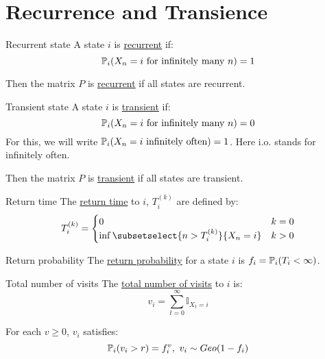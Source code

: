 \documentclass[../Main.tex]{subfiles}
\begin{document}
\section{Recurrence and Transience}
\begin{definition}{Recurrent state}
    A state $i$ is \underline{recurrent} if:
    \begin{equation*}
        \P_i(X_n = i \text{ for infinitely many }n) = 1
    \end{equation*}
\end{definition}
Then the matrix $P$ is \underline{recurrent} if all states are recurrent.
\begin{definition}{Transient state}
    A state $i$ is \underline{transient} if:
    \begin{equation*}
        \P_i(X_n = i \text{ for infinitely many }n) = 0
    \end{equation*}
    For this, we will write $\P_i(X_n = i \io) = 1$. Here i.o. stands for infinitely often.
\end{definition}
Then the matrix $P$ is \underline{transient} if all states are transient.
\begin{definition}{Return time}
    The \underline{return time} to $i$, $T_i^{(k)}$ are defined by:
    \begin{equation*}
        T_i^{(k)} =
        \begin{cases}
            0 & k=0 \\
            \inf\subsetselect{n>T_i^{(k)}}{X_n = i} & k > 0
        \end{cases}
    \end{equation*}
\end{definition}
\begin{definition}{Return probability}
    The \underline{return probability} for a state $i$ is $f_i = \P_i(T_i < \infty)$.
\end{definition}
\begin{definition}{Total number of visits}
    The \underline{total number of visits} to $i$ is:
    \begin{equation*}
        v_i = \sum_{t = 0}^\infty \mathbb{I}_{X_t = i}
    \end{equation*}
\end{definition}
\begin{lemma}
    For each $v \geq 0$, $v_i$ satisfies:
    \begin{equation*}
        \P_i(v_i > r) = f_i^v,~v_i \sim Geo(1-f_i)
    \end{equation*}
    \label{lemReturnGeometric}
\end{lemma}
\end{document}
